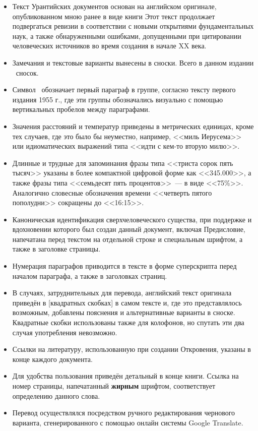 \begin{itemize}
\item Текст Урантийских документов основан на английском оригинале, опубликованном мною ранее в виде книги
      Этот текст продолжает подвергаться ревизии в соответствии с новыми открытиями фундаментальных наук, а также обнаруженными
      ошибками, допущенными при цитировании человеческих источников во время создания
       в начале XX века.
\item Замечания и текстовые варианты вынесены в сноски. Всего в данном издании \totalnfnsts\ сносок.
\item Символ \pc\ обозначает первый параграф в группе, согласно тексту первого издания 1955 г., где эти группы обозначались визуально с помощью вертикальных пробелов между параграфами.
\item Значения расстояний и температур приведены в метрических единицах, кроме тех случаев, где это было бы неуместно,
      например, <<миль Иерусема>> или идиоматических выражений типа <<идти с кем-то вторую милю>>.
\item Длинные и трудные для запоминания фразы типа <<триста сорок пять тысяч>> указаны в более компактной цифровой
      форме как <<345.000>>, а также фразы типа <<семьдесят пять процентов>>~--- в виде <<75\%>>.
      Аналогично словесные обозначения времени <<четверть пятого пополудни>> сокращены до <<16:15>>.
\item Каноническая идентификация сверхчеловеческого существа, при поддержке и вдохновении которого был создан данный документ,
      включая Предисловие, напечатана перед текстом на отдельной строке и специальным шрифтом, а также в заголовке страницы.
\item Нумерация параграфов приводится в тексте в форме суперскрипта перед началом параграфа, а также в заголовках страниц.
\item В случаях, затруднительных для перевода, английский текст оригинала приведён в
      [квадратных скобках] в самом тексте и, где это представлялось возможным,
      добавлены пояснения и альтернативные варианты в сноске.
      Квадратные скобки использованы также для колофонов, но спутать эти два случая употребления невозможно.
\item Ссылки на литературу, использованную при создании Откровения, указаны в конце каждого документа.
\item Для удобства пользования приведён детальный  в конце книги.
      Ссылка на номер страницы, напечатанный \textbf{жирным} шрифтом, соответствует определению данного слова.
\item Перевод осуществлялся посредством ручного редактирования чернового варианта, сгенерированного с помощью онлайн системы
      Google Translate.
\end{itemize}

